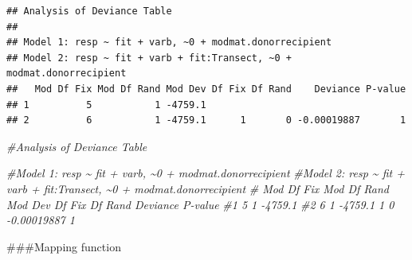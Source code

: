 \documentclass[
]{article}
\newenvironment{Shaded}{\begin{snugshade}}{\end{snugshade}}
\newcommand{\CommentTok}[1]{\textcolor[rgb]{0.56,0.35,0.01}{\textit{#1}}}
\begin{document}
\begin{verbatim}
## Analysis of Deviance Table
## 
## Model 1: resp ~ fit + varb, ~0 + modmat.donorrecipient
## Model 2: resp ~ fit + varb + fit:Transect, ~0 + modmat.donorrecipient
##   Mod Df Fix Mod Df Rand Mod Dev Df Fix Df Rand    Deviance P-value
## 1          5           1 -4759.1                                   
## 2          6           1 -4759.1      1       0 -0.00019887       1
\end{verbatim}

\begin{Shaded}
\begin{Highlighting}[]
\CommentTok{\#Analysis of Deviance Table}

\CommentTok{\#Model 1: resp \textasciitilde{} fit + varb, \textasciitilde{}0 + modmat.donorrecipient}
\CommentTok{\#Model 2: resp \textasciitilde{} fit + varb + fit:Transect, \textasciitilde{}0 + modmat.donorrecipient}
\CommentTok{\#  Mod Df Fix Mod Df Rand Mod Dev Df Fix Df Rand    Deviance P{-}value}
\CommentTok{\#1          5           1 {-}4759.1                                   }
\CommentTok{\#2          6           1 {-}4759.1      1       0 {-}0.00019887       1}
\end{Highlighting}
\end{Shaded}

\#\#\#Mapping function
\end{document}
